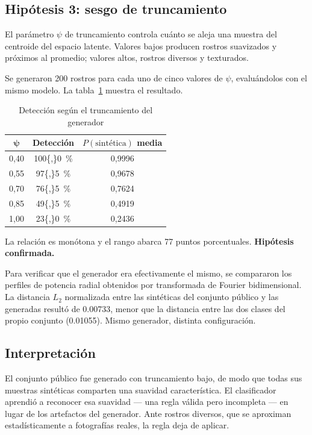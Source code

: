 \documentclass[10pt,twocolumn,letterpaper]{article}
\begin{document}
\subsection{Hipótesis 3: sesgo de truncamiento}

El parámetro $\psi$ de truncamiento controla cuánto se aleja una muestra del
centroide del espacio latente. Valores bajos producen rostros suavizados y
próximos al promedio; valores altos, rostros diversos y texturados.

Se generaron \num{200} rostros para cada uno de cinco valores de $\psi$,
evaluándolos con el mismo modelo. La tabla~\ref{tab:truncation} muestra el
resultado.

\begin{table}[t]
\caption{Detección según el truncamiento del generador}
\label{tab:truncation}
\centering\small
\begin{tabular}{ccc}
\toprule
$\boldsymbol{\psi}$ & \textbf{Detección} & \textbf{$P(\text{sintética})$ media} \\
\midrule
0,40 & \SI{100{,}0}{\percent} & 0,9996 \\
0,55 & \SI{97{,}5}{\percent}  & 0,9678 \\
0,70 & \SI{76{,}5}{\percent}  & 0,7624 \\
0,85 & \SI{49{,}5}{\percent}  & 0,4919 \\
1,00 & \SI{23{,}0}{\percent}  & 0,2436 \\
\bottomrule
\end{tabular}
\end{table}

La relación es monótona y el rango abarca \num{77} puntos porcentuales.
\textbf{Hipótesis confirmada.}

Para verificar que el generador era efectivamente el mismo, se compararon
los perfiles de potencia radial obtenidos por transformada de Fourier
bidimensional. La distancia $L_2$ normalizada entre las sintéticas del
conjunto público y las generadas resultó de \num{0.00733}, menor que la
distancia entre las dos clases del propio conjunto (\num{0.01055}). Mismo
generador, distinta configuración.

\subsection{Interpretación}

El conjunto público fue generado con truncamiento bajo, de modo que todas
sus muestras sintéticas comparten una suavidad característica. El
clasificador aprendió a reconocer esa suavidad --- una regla válida pero
incompleta --- en lugar de los artefactos del generador. Ante rostros
diversos, que se aproximan estadísticamente a fotografías reales, la regla
deja de aplicar.
\end{document}
